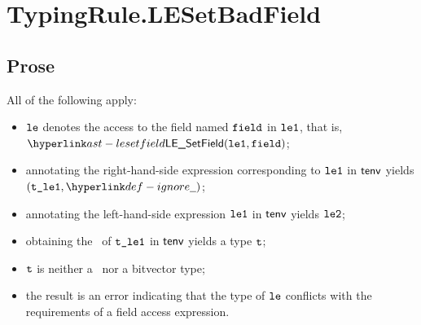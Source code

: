 \begin{mathpar}
\end{mathpar}

\section{TypingRule.LESetBadField \label{sec:TypingRule.LESetBadField}}

\subsection{Prose}
All of the following apply:
\begin{itemize}
  \item $\vle$ denotes the access to the field named $\field$ in $\vleone$, that is, \\ $\LESetField(\vleone, \field)$;
  \item annotating the right-hand-side expression corresponding to $\vleone$ in $\tenv$ yields \\ $(\vtleone, \Ignore)$\ProseOrTypeError;
  \item annotating the left-hand-side expression $\vleone$ in $\tenv$ yields $\vletwo$\ProseOrTypeError;
  \item obtaining the \structure\ of $\vtleone$ in $\tenv$ yields a type $\vt$\ProseOrTypeError;
  \item $\vt$ is neither a \structuredtype\ nor a bitvector type;
  \item the result is an error indicating that the type of $\vle$ conflicts with the requirements of a field access expression.
\end{itemize}

